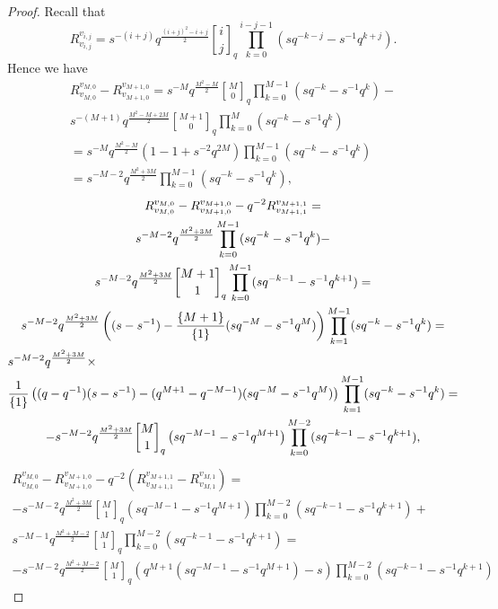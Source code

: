 \documentclass[reqno,a4paper,11pt]{amsart}
\numberwithin{equation}{section}
\numberwithin{figure}{section}
\theoremstyle{definition}
\theoremstyle{plain}
\begin{document}
%
\begin{proof}
Recall that
\[
R_{v_{i,j}}^{v_{i,j}}
=
s^{-(i+j)}q^{\frac{(i+j)^2-i+j}{2}}
{i \brack j}_q \prod_{k=0}^{i-j-1}(sq^{-k-j}-s^{-1}q^{k+j}).
\]
Hence we have
\begin{multline*}
R_{v_{M,0}}^{v_{M,0}}
-
R_{v_{M+1,0}}^{v_{M+1,0}}
=
s^{-M}q^{\frac{M^2-M}{2}}
{M \brack 0}_q \prod_{k=0}^{M-1}(sq^{-k}-s^{-1}q^{k})
-
\\
s^{-(M+1)}q^{\frac{M^2-M+2M}{2}}
{M+1 \brack 0}_q \prod_{k=0}^{M}(sq^{-k}-s^{-1}q^{k})
\\
=
s^{-M}q^{\frac{M^2-M}{2}}  \left(
1-1+s^{-2}q^{2M}
\right)
 \prod_{k=0}^{M-1}(sq^{-k}-s^{-1}q^{k})
\\
=
s^{-M-2}q^{\frac{M^2+3M}{2}} 
 \prod_{k=0}^{M-1}(sq^{-k}-s^{-1}q^{k}),
\end{multline*}
%
\begin{multline*}
R_{v_{M,0}}^{v_{M,0}}
-
R_{v_{M+1,0}}^{v_{M+1,0}}
-
q^{-2} R_{v_{M+1,1}}^{v_{M+1,1}}
=
\\
s^{-M-2}q^{\frac{M^2+3M}{2}} 
 \prod_{k=0}^{M-1}(sq^{-k}-s^{-1}q^{k})
 -
 \\
 s^{-M-2}q^{\frac{M^2 + 3M}{2}}
 {M+1 \brack 1}_q 
  \prod_{k=0}^{M-1}(sq^{-k-1}-s^{-1}q^{k+1})
=
\\
s^{-M-2}q^{\frac{M^2+3M}{2}} 
\left(
(s-s^{-1})
 -
\frac{\{M+1\}}{\{1\}}
 (sq^{-M}-s^{-1}q^{M})\right)
 \prod_{k=1}^{M-1}(sq^{-k}-s^{-1}q^{k})
=
\\
s^{-M-2}q^{\frac{M^2+3M}{2}} 
\times\hfill
\\
\frac{1}{\{1\}} 
\left((q-q^{-1})
(s-s^{-1})
 -
(q^{M+1} - q^{-M-1})
 (sq^{-M}-s^{-1}q^{M})
 \right)
 \prod_{k=1}^{M-1}(sq^{-k}-s^{-1}q^{k})
=
\\
-s^{-M-2}q^{\frac{M^2+3M}{2}} 
 {M \brack 1}_q 
\left(sq^{-M-1} - 
s^{-1}q^{M+1}
 \right)
 \prod_{k=0}^{M-2}(sq^{-k-1}-s^{-1}q^{k+1}), 
\end{multline*}
%
\begin{multline*}
R_{v_{M,0}}^{v_{M,0}}
-
R_{v_{M+1,0}}^{v_{M+1,0}}
-
q^{-2} (R_{v_{M+1,1}}^{v_{M+1,1}}
-
R_{v_{M,1}}^{v_{M,1}})
=
\\
-s^{-M-2}q^{\frac{M^2+3M}{2}} 
 {M \brack 1}_q 
\left(sq^{-M-1} - 
s^{-1}q^{M+1}
 \right)
 \prod_{k=0}^{M-2}(sq^{-k-1}-s^{-1}q^{k+1})
 +
 \\
s^{-M-1}q^{\frac{M^2+M-2}{2}}
 {M \brack 1}_q 
  \prod_{k=0}^{M-2}(sq^{-k-1}-s^{-1}q^{k+1})  
=
\\
-s^{-M-2}q^{\frac{M^2+M-2}{2}} 
 {M \brack 1}_q 
\left(q^{M+1}(sq^{-M-1} - 
s^{-1}q^{M+1}
 )
 -
 s
\right)
\prod_{k=0}^{M-2}(sq^{-k-1}-s^{-1}q^{k+1})

\end{multline*}
\end{proof}
\end{document}
